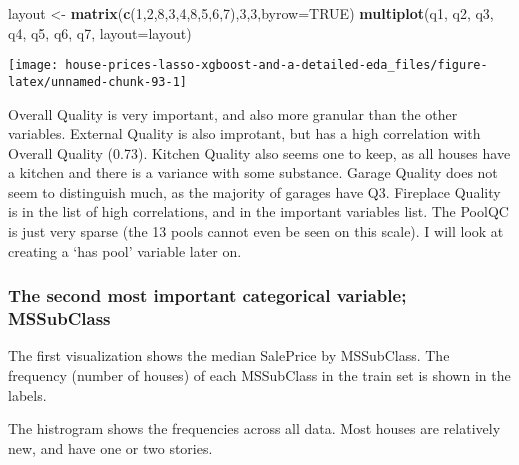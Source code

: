 \documentclass[]{article}
\newenvironment{Shaded}{\begin{snugshade}}{\end{snugshade}}
\newcommand{\KeywordTok}[1]{\textcolor[rgb]{0.13,0.29,0.53}{\textbf{#1}}}
\newcommand{\DataTypeTok}[1]{\textcolor[rgb]{0.13,0.29,0.53}{#1}}
\newcommand{\DecValTok}[1]{\textcolor[rgb]{0.00,0.00,0.81}{#1}}
\newcommand{\StringTok}[1]{\textcolor[rgb]{0.31,0.60,0.02}{#1}}
\newcommand{\OtherTok}[1]{\textcolor[rgb]{0.56,0.35,0.01}{#1}}
\newcommand{\NormalTok}[1]{#1}
\begin{document}
\begin{Shaded}
\begin{Highlighting}[]
\NormalTok{layout <-}\StringTok{ }\KeywordTok{matrix}\NormalTok{(}\KeywordTok{c}\NormalTok{(}\DecValTok{1}\NormalTok{,}\DecValTok{2}\NormalTok{,}\DecValTok{8}\NormalTok{,}\DecValTok{3}\NormalTok{,}\DecValTok{4}\NormalTok{,}\DecValTok{8}\NormalTok{,}\DecValTok{5}\NormalTok{,}\DecValTok{6}\NormalTok{,}\DecValTok{7}\NormalTok{),}\DecValTok{3}\NormalTok{,}\DecValTok{3}\NormalTok{,}\DataTypeTok{byrow=}\OtherTok{TRUE}\NormalTok{)}
\KeywordTok{multiplot}\NormalTok{(q1, q2, q3, q4, q5, q6, q7, }\DataTypeTok{layout=}\NormalTok{layout)}
\end{Highlighting}
\end{Shaded}

\texttt{[image: house-prices-lasso-xgboost-and-a-detailed-eda\_files/figure-latex/unnamed-chunk-93-1]}

Overall Quality is very important, and also more granular than the other
variables. External Quality is also improtant, but has a high
correlation with Overall Quality (0.73). Kitchen Quality also seems one
to keep, as all houses have a kitchen and there is a variance with some
substance. Garage Quality does not seem to distinguish much, as the
majority of garages have Q3. Fireplace Quality is in the list of high
correlations, and in the important variables list. The PoolQC is just
very sparse (the 13 pools cannot even be seen on this scale). I will
look at creating a `has pool' variable later on.

\subsubsection{The second most important categorical variable;
MSSubClass}\label{the-second-most-important-categorical-variable-mssubclass}

The first visualization shows the median SalePrice by MSSubClass. The
frequency (number of houses) of each MSSubClass in the train set is
shown in the labels.

The histrogram shows the frequencies across all data. Most houses are
relatively new, and have one or two stories.
\end{document}
